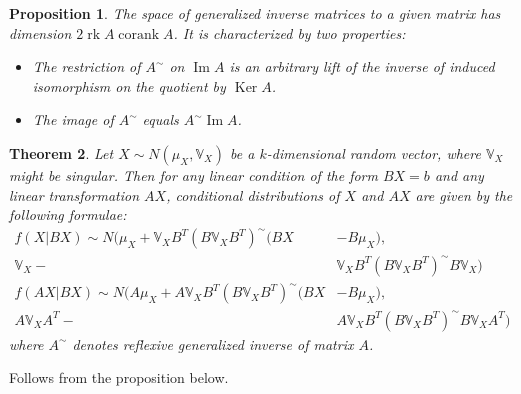 \documentclass[12pt]{article}
\newtheorem{theorem}{Theorem}[section]
\newtheorem{proposition}[theorem]{Proposition}
\theoremstyle{definition}
\theoremstyle{remark}
\numberwithin{equation}{section}
\newcommand{\VV}{\mathbb{V}}
\begin{document}
\begin{proposition}
	The space of generalized inverse matrices to a given matrix has dimension $2 \operatorname{rk}A\operatorname{corank}A$. It is characterized by two properties:
	\begin{itemize}
		\item The restriction of $A^{\sim}$ on $\operatorname{Im}A$ is an arbitrary lift of the inverse of induced isomorphism on the quotient by $\operatorname{Ker}A$.
		\item The image of $A^{\sim}$ equals $A^{\sim} \operatorname{Im}A$.
	\end{itemize}
\end{proposition}

\begin{theorem}
	Let $X\sim N(\mu_X, \VV_X)$ be a $k$-dimensional random vector, where $\VV_X$ might be singular. Then for any linear condition of the form $BX = b$ and any linear transformation $AX$, conditional distributions of $X$ and $AX$ are given by the following formulae:
	\begin{align*}
		f(X|BX) \sim N(\mu_X + \VV_XB^T(B\VV_XB^T)^{\sim}(BX& - B\mu_X),\\ \VV_X - &\VV_XB^T(B\VV_XB^T)^{\sim}B\VV_X)\\
		f(AX|BX) \sim N(A\mu_X + A\VV_XB^T(B\VV_XB^T)^{\sim}(BX& - B\mu_X),\\ A\VV_XA^T - &A\VV_XB^T(B\VV_XB^T)^{\sim}B\VV_XA^T)
	\end{align*}
	where $A^{\sim}$ denotes reflexive generalized inverse of matrix $A$.
\end{theorem}

\proof Follows from the proposition below.
\end{document}
